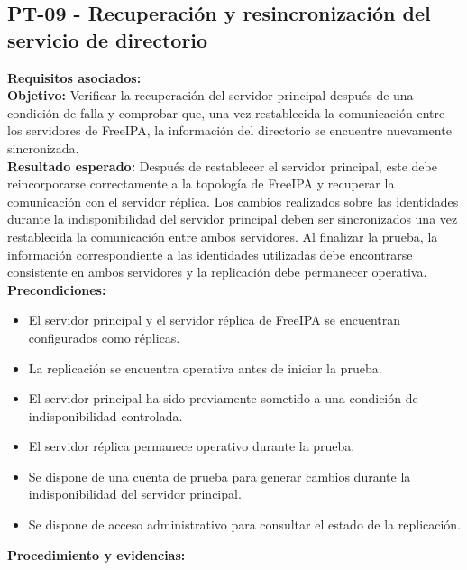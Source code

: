 \subsection{PT-09 - Recuperación y resincronización del servicio de directorio}\label{subsec:pt09}
\textbf{Requisitos asociados:}\\
\textbf{Objetivo:} Verificar la recuperación del servidor principal después de una condición de falla y comprobar que, una vez restablecida la comunicación entre los servidores de FreeIPA, la información del directorio se encuentre nuevamente sincronizada.\\
\textbf{Resultado esperado:} Después de restablecer el servidor principal, este debe reincorporarse correctamente a la topología de FreeIPA y recuperar la comunicación con el servidor réplica.
Los cambios realizados sobre las identidades durante la indisponibilidad del servidor principal deben ser sincronizados una vez restablecida la comunicación entre ambos servidores. Al finalizar la prueba, la información correspondiente a las identidades utilizadas debe encontrarse consistente en ambos servidores y la replicación debe permanecer operativa.\\
\textbf{Precondiciones:}
\begin{itemize}
	\item El servidor principal y el servidor réplica de FreeIPA se encuentran configurados como réplicas.
	\item La replicación se encuentra operativa antes de iniciar la prueba.
	\item El servidor principal ha sido previamente sometido a una condición de indisponibilidad controlada.
	\item El servidor réplica permanece operativo durante la prueba.
	\item Se dispone de una cuenta de prueba para generar cambios durante la indisponibilidad del servidor principal.
	\item Se dispone de acceso administrativo para consultar el estado de la replicación.
\end{itemize}
\textbf{Procedimiento y evidencias:}
